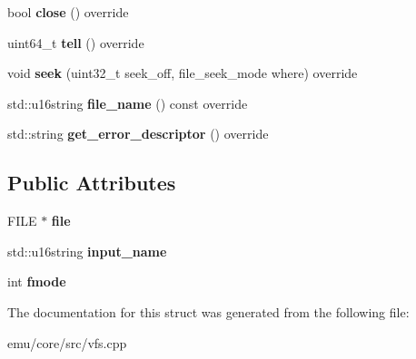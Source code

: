 \begin{DoxyCompactItemize}
bool {\bfseries close} () override
\item 
\mbox{\label{structeka2l1_1_1physical__file_ac9a77901389fe77031f0661981bb1fde}} 
uint64\+\_\+t {\bfseries tell} () override
\item 
\mbox{\label{structeka2l1_1_1physical__file_ad2f3368378b60b63c0f42ceff6036d9e}} 
void {\bfseries seek} (uint32\+\_\+t seek\+\_\+off, file\+\_\+seek\+\_\+mode where) override
\item 
\mbox{\label{structeka2l1_1_1physical__file_a5b13ae4f634bf2aaedd0e47e6bd7b69f}} 
std\+::u16string {\bfseries file\+\_\+name} () const override
\item 
\mbox{\label{structeka2l1_1_1physical__file_a6d43b15e47961c11d02e18af31325314}} 
std\+::string {\bfseries get\+\_\+error\+\_\+descriptor} () override
\end{DoxyCompactItemize}
\subsection*{Public Attributes}
\begin{DoxyCompactItemize}
\item 
\mbox{\label{structeka2l1_1_1physical__file_ae621cf0ab5f09c8ecbd57df08eff4e53}} 
F\+I\+LE $\ast$ {\bfseries file}
\item 
\mbox{\label{structeka2l1_1_1physical__file_adac6f70ec872c7dc920b3386cd2d061a}} 
std\+::u16string {\bfseries input\+\_\+name}
\item 
\mbox{\label{structeka2l1_1_1physical__file_a550c444506d4a0dd8539de88b4bcc132}} 
int {\bfseries fmode}
\end{DoxyCompactItemize}


The documentation for this struct was generated from the following file\+:\begin{DoxyCompactItemize}
\item 
emu/core/src/vfs.\+cpp\end{DoxyCompactItemize}
